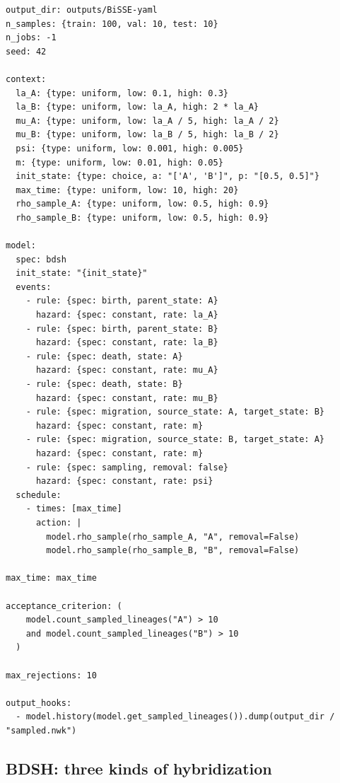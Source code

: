 \documentclass[11pt]{article}
\begin{document}
\begin{lstlisting}[style=cfg]
output_dir: outputs/BiSSE-yaml
n_samples: {train: 100, val: 10, test: 10}
n_jobs: -1
seed: 42

context:
  la_A: {type: uniform, low: 0.1, high: 0.3}
  la_B: {type: uniform, low: la_A, high: 2 * la_A}
  mu_A: {type: uniform, low: la_A / 5, high: la_A / 2}
  mu_B: {type: uniform, low: la_B / 5, high: la_B / 2}
  psi: {type: uniform, low: 0.001, high: 0.005}
  m: {type: uniform, low: 0.01, high: 0.05}
  init_state: {type: choice, a: "['A', 'B']", p: "[0.5, 0.5]"}
  max_time: {type: uniform, low: 10, high: 20}
  rho_sample_A: {type: uniform, low: 0.5, high: 0.9}
  rho_sample_B: {type: uniform, low: 0.5, high: 0.9}

model:
  spec: bdsh
  init_state: "{init_state}"
  events:
    - rule: {spec: birth, parent_state: A}
      hazard: {spec: constant, rate: la_A}
    - rule: {spec: birth, parent_state: B}
      hazard: {spec: constant, rate: la_B}
    - rule: {spec: death, state: A}
      hazard: {spec: constant, rate: mu_A}
    - rule: {spec: death, state: B}
      hazard: {spec: constant, rate: mu_B}
    - rule: {spec: migration, source_state: A, target_state: B}
      hazard: {spec: constant, rate: m}
    - rule: {spec: migration, source_state: B, target_state: A}
      hazard: {spec: constant, rate: m}
    - rule: {spec: sampling, removal: false}
      hazard: {spec: constant, rate: psi}
  schedule:
    - times: [max_time]
      action: |
        model.rho_sample(rho_sample_A, "A", removal=False)
        model.rho_sample(rho_sample_B, "B", removal=False)

max_time: max_time

acceptance_criterion: (
    model.count_sampled_lineages("A") > 10
    and model.count_sampled_lineages("B") > 10
  )

max_rejections: 10

output_hooks:
  - model.history(model.get_sampled_lineages()).dump(output_dir / "sampled.nwk")
\end{lstlisting}

\subsection{BDSH: three kinds of hybridization}
\label{sec:bdsh}
\end{document}
